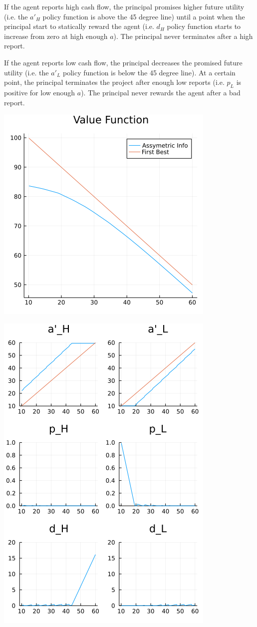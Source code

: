 \documentclass{article}
\begin{document}
\bigskip

If the agent reports high cash flow, the principal promises higher future utility (i.e. the $a'_H$ policy function is above the 45 degree line) until a point when the principal start to statically reward the agent (i.e. $d_H$ policy function starts to increase from zero at high enough $a$).  The principal never terminates after a high report.

\bigskip

If the agent reports low cash flow, the principal decreases the promised future utility (i.e. the $a'_L$ policy function is below the 45 degree line). At a certain point, the principal terminates the project after enough low reports (i.e. $p_L$ is positive for low enough $a$).  The principal never rewards the agent after a bad report.

\includegraphics{value_function.png}



\includegraphics{policy_function.png}
\end{document}
